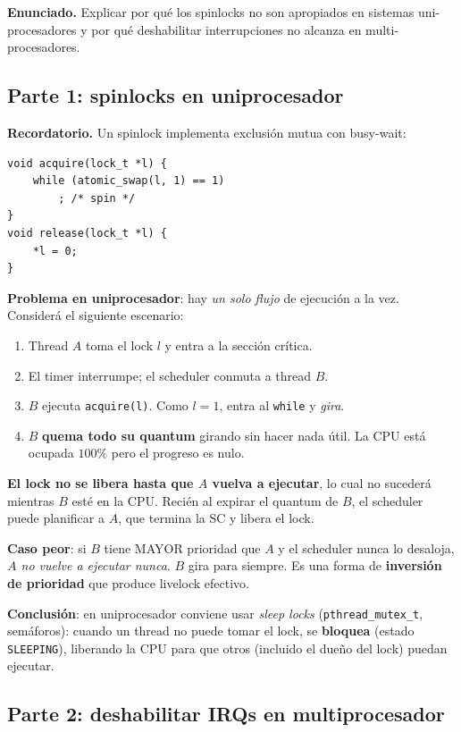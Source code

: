 \documentclass[11pt,a4paper]{article}
\begin{document}
\textbf{Enunciado.} Explicar por qué los spinlocks no son apropiados
en sistemas uni-procesadores y por qué deshabilitar interrupciones
no alcanza en multi-procesadores.

\subsection*{Parte 1: spinlocks en uniprocesador}

\textbf{Recordatorio.} Un spinlock implementa exclusión mutua con
busy-wait:

\begin{lstlisting}[style=cstyle]
void acquire(lock_t *l) {
    while (atomic_swap(l, 1) == 1)
        ; /* spin */
}
void release(lock_t *l) {
    *l = 0;
}
\end{lstlisting}

\textbf{Problema en uniprocesador}: hay \emph{un solo flujo} de
ejecución a la vez. Considerá el siguiente escenario:

\begin{enumerate}[leftmargin=*,nosep]
    \item Thread $A$ toma el lock $l$ y entra a la sección crítica.
    \item El timer interrumpe; el scheduler conmuta a thread $B$.
    \item $B$ ejecuta \texttt{acquire(l)}. Como $l = 1$, entra al
        \texttt{while} y \emph{gira}.
    \item $B$ \textbf{quema todo su quantum} girando sin hacer nada
        útil. La CPU está ocupada $100\%$ pero el progreso es nulo.
\end{enumerate}

\textbf{El lock no se libera hasta que $A$ vuelva a ejecutar}, lo
cual no sucederá mientras $B$ esté en la CPU. Recién al expirar el
quantum de $B$, el scheduler puede planificar a $A$, que termina
la SC y libera el lock.

\textbf{Caso peor}: si $B$ tiene MAYOR prioridad que $A$ y el
scheduler nunca lo desaloja, \emph{$A$ no vuelve a ejecutar nunca}.
$B$ gira para siempre. Es una forma de \textbf{inversión de
prioridad} que produce livelock efectivo.

\textbf{Conclusión}: en uniprocesador conviene usar \emph{sleep
locks} (\texttt{pthread\_mutex\_t}, semáforos): cuando un thread no
puede tomar el lock, se \textbf{bloquea} (estado \texttt{SLEEPING}),
liberando la CPU para que otros (incluido el dueño del lock) puedan
ejecutar.

\subsection*{Parte 2: deshabilitar IRQs en multiprocesador}
\end{document}
